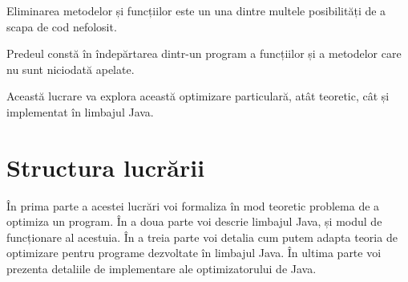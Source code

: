Eliminarea metodelor și funcțiilor este un una dintre multele
posibilități de a scapa de cod nefolosit.

Predeul constă în îndepărtarea dintr-un program a funcțiilor și a
metodelor care nu sunt niciodată apelate.

Această lucrare va explora această optimizare particulară, atât
teoretic, cât și implementat în limbajul Java.



\section{Structura lucrării}

În prima parte a acestei lucrări voi formaliza în mod teoretic
problema de a optimiza un program.
În a doua parte voi descrie limbajul Java, și modul de
funcționare al acestuia.
În a treia parte voi detalia cum putem adapta teoria de
optimizare pentru programe dezvoltate în limbajul Java.
În ultima parte voi prezenta detaliile de implementare ale
optimizatorului de Java.
